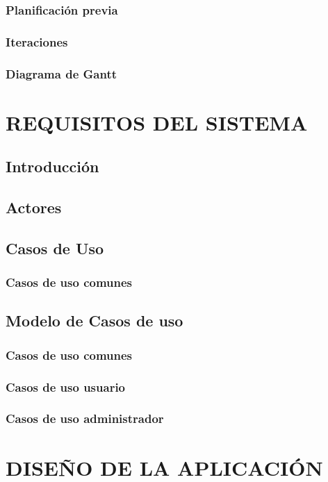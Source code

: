 \documentclass[12pt, a4paper, twoside]{book}
\begin{document}
	\subsection{Planificación previa}
	
	\subsection{Iteraciones}
	
	\subsection{Diagrama de Gantt}

	\chapter{REQUISITOS DEL SISTEMA}
	\section{Introducción}
	\section{Actores}
	\section{Casos de Uso}
	\subsection{Casos de uso comunes}		 
	\section{Modelo de Casos de uso}
	\subsection{Casos de uso comunes}
	\subsection{Casos de uso usuario}
	\subsection{Casos de uso administrador}
	\chapter{DISEÑO DE LA APLICACIÓN}
\end{document}
